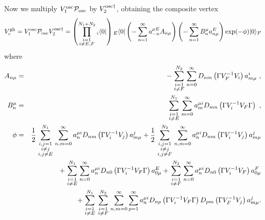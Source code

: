 \documentclass[a4paper,11pt]{article}
\begin{document}
Now we multiply $V^{\rm osc}_1{\cal P}_{\rm osc}$ by $V^{{\rm osc}\dagger }_2$, obtaining the composite vertex
\begin{equation}
V_c^{\rm gh}=V^{\rm osc}_1{\cal P}_{\rm osc}V^{{\rm osc}\dagger }_2 = \left( \prod_{\scriptstyle i=1\atop \scriptstyle i\neq E,F}^{N_1+N_2}{ }_i\langle 0|\right) { }_E\langle 0|\left( -\sum_{n=1}^\infty a^{\mu E}_{-n}A_{n\mu }\right) \left( -\sum_{n=1}^\infty B^\mu _na^E_{n\mu }\right) \exp (-\phi )|0\rangle _F
\end{equation}
where
\begin{eqnarray}
A_{n\mu } & = & -\sum_{\scriptstyle i=1\atop \scriptstyle i\neq F}^{N_2}\sum_{n=0}^\infty D_{nm}\left( \Gamma V^{-1}_FV_i\right) a^i_{m\mu }\ ,\\ 
B^\mu _n & = & \sum_{\scriptstyle i=1\atop \scriptstyle i\neq E}^{N_1}\sum_{m=0}^\infty a^{\mu i}_mD_{mn}\left( \Gamma V^{-1}_iV_F\Gamma \right) \ ,\\ 
\phi  & = & \frac{1}{2}\sum_{{\scriptstyle i,j=1\atop \scriptstyle i\neq j}\atop \scriptstyle i,j\neq E}^{N_1}\sum_{n,m=0}^\infty a^{\mu i}_nD_{nm}\left( \Gamma V^{-1}_iV_j\right) a^j_{m\mu } +\frac{1}{2}\sum_{{\scriptstyle i,j=1\atop \scriptstyle i\neq j}\atop \scriptstyle i,j\neq F}^{N_2}\sum_{n,m=0}^\infty a^{\mu i}_nD_{nm}\left( \Gamma V^{-1}_iV_j\right) a^j_{m\mu }\nonumber \\
 & & +\sum_{\scriptstyle i=1\atop \scriptstyle i\neq E}^{N_1}\sum_{n=0}^\infty a^{\mu i}_nD_{n0}\left( \Gamma V^{-1}_iV_F\Gamma \right) a^E_{0\mu } +\sum_{\scriptstyle i=1\atop \scriptstyle i\neq F}^{N_2}\sum_{n=0}^\infty a^{\mu i}_nD_{n0}\left( \Gamma V^{-1}_iV_F\right) a^F_{0\mu }\nonumber \\ 
 & & +\sum_{\scriptstyle i=1\atop \scriptstyle i\neq E}^{N_1}\sum_{\scriptstyle i=1\atop \scriptstyle i\neq F}^{N_2}\sum_{n,m=0}^\infty \sum_{p=1}^\infty a^{\mu i}_nD_{np}\left( \Gamma V^{-1}_iV_F\Gamma \right) D_{pm}\left( \Gamma V^{-1}_FV_j\right) a^j_{m\mu }.
\end{eqnarray}
\end{document}
